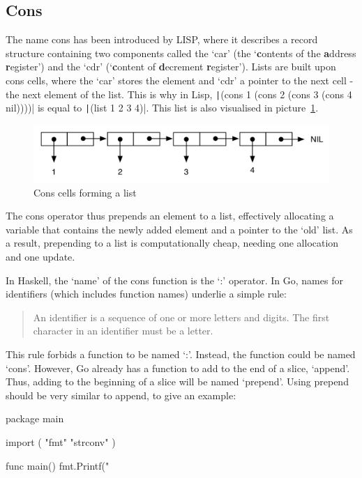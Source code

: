 \subsection{Cons}

The name cons has been introduced by LISP, where it describes a record structure
containing two components called the `car' (the `\textbf{c}ontents of the \textbf{a}ddress \textbf{r}egister')
and the `cdr' (`\textbf{c}ontent of \textbf{d}ecrement \textbf{r}egister').
Lists are built upon cons cells, where the `car' stores the element and `cdr' a
pointer to the next cell - the next element of the list.
This is why in Lisp, \texttt|(cons 1 (cons 2 (cons 3 (cons 4 nil))))| is equal to
\texttt|(list 1 2 3 4)|. This list is also visualised in picture~\ref{fig:cons}.

\begin{figure}[h!]
  \includegraphics[width=\linewidth]{../img/cons.png}
  \caption{Cons cells forming a list\autocite{cons-image-source}}
  \label{fig:cons}
\end{figure}

The cons operator thus prepends an element to a list, effectively allocating a
variable that contains the newly added element and a pointer to the `old' list.
As a result, prepending to a list is computationally cheap, needing one allocation
and one update.

In Haskell, the `name' of the cons function is the `:' operator.
In Go, names for identifiers (which includes function names) underlie a simple
rule:
\begin{quote}
    An identifier is a sequence of one or more letters and digits. The first
    character in an identifier must be a letter.\autocite{spec-identifiers}
\end{quote}

This rule forbids a function to be named `:'. Instead, the function could be
named `cons'. However, Go already has a function to add to the end of a slice,
`append'. Thus, adding to the beginning of a slice will be named `prepend'.
Using prepend should be very similar to append, to give an example:

\begin{code}
    \label{code:prepend-go}
    \begin{gocode}
package main

import (
  "fmt"
  "strconv"
)

func main() {
    fmt.Printf("%
}
\end{gocode}
\end{code}
